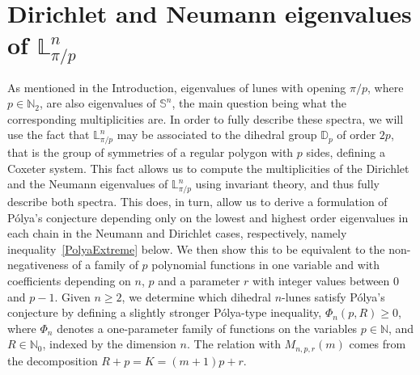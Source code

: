 \documentclass[11pt,a4paper,times]{amsart}
\theoremstyle{plain}
\theoremstyle{definition}
\numberwithin{equation}{section}
\newcommand{\N}{\mathbb{N}}
\newcommand{\Se}{\mathbb{S}}
\newcommand{\lune}[2]{\mathbb{L}^{#1}_{#2}}
\newcommand{\txtg}{\textcolor{green}}
\begin{document}
{\section{Dirichlet and Neumann eigenvalues of $\lune{n}{\pi/p}$\label{Eigen}}
As mentioned in the Introduction, eigenvalues of lunes with opening $\pi/p$, where $p\in \N_2$, are also eigenvalues of $\Se^n$,
the main question being what the corresponding multiplicities are. In order to fully describe these spectra, we will use the
fact that $\lune{n}{\pi/p}$ may be associated to {the dihedral group} $\mathbb{D}_{p}$
of order $2p$, that is the group of symmetries of a regular polygon with $p$ sides, defining a Coxeter system.
This fact allows us  to compute the multiplicities of the Dirichlet and the Neumann eigenvalues of $\lune{n}{\pi/p}$ using invariant
theory, {and thus fully describe both spectra}. This does, in turn, allow us to derive a formulation
of P\'{o}lya's conjecture depending only on the lowest and highest order eigenvalues in each chain in the Neumann and Dirichlet cases,
respectively, namely inequality~\eqref{PolyaExtreme} below. We then show this to be  equivalent to the non-negativeness of a family
of $p$  polynomial functions in one variable and with coefficients depending on $n$, $p$ and a parameter $r$ with integer values
between $0$ and $p-1$. Given $n\geq 2$, we determine which dihedral $n$-lunes satisfy P\'{o}lya's conjecture by defining a
slightly stronger P\' {o}lya-type inequality, $\Phi_n(p,R)\geq 0$, {where $\Phi_n$ denotes a one-parameter family of functions on
the variables $p\in \N$, and $R\in \N_0$, indexed by the dimension $n$.} The relation with $M_{n,p,r}(m)$ comes from
the decomposition $R+p=K=(m+1)p+r$.

}
\end{document}

